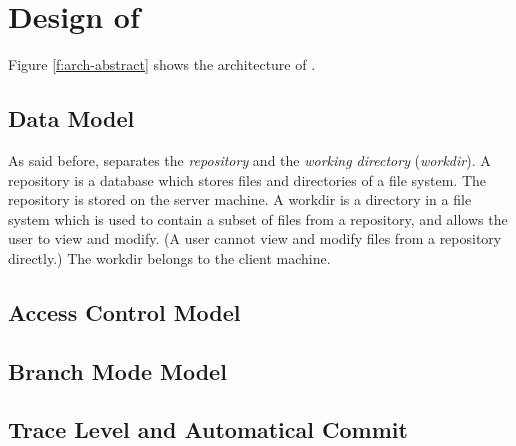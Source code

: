 \section{Design of \sys}
\label{s:design}



Figure \ref{f:arch-abstract}  shows the architecture of \sys.

\subsection{Data Model}

As said before, \sys separates the \emph{repository} and the \emph{working
directory} (\emph{workdir}). A repository is a database which stores files
and directories of a file system. The repository is stored on the server
machine. A workdir is a directory in a file system which is used to
contain a subset of files from a repository, and allows the user to view and
modify. (A user cannot view and modify files from a repository directly.) The
workdir belongs to the client machine.


\subsection{Access Control Model}


\subsection{Branch Mode Model}


\subsection{Trace Level and Automatical Commit}

